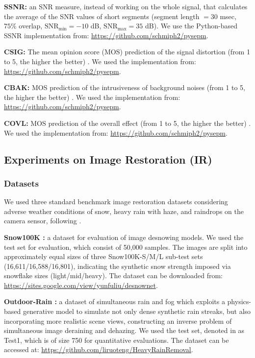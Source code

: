\noindent\textbf{SSNR:} an SNR measure, instead of working on the whole signal, that calculates the average of the SNR values of short segments (segment length $=30$ msec, $75\%$ overlap, $\text{SNR}_{\text{min}}=-10$ dB, $\text{SNR}_{\text{max}}=35$ dB). We use the Python-based SSNR implementation from: \url{https://github.com/schmiph2/pysepm}.

\noindent\textbf{CSIG:} The mean opinion score (MOS) prediction of the signal distortion (from 1 to 5, the higher the better) \citep{hu2007evaluation}. We used the implementation from: \url{https://github.com/schmiph2/pysepm}.

\noindent\textbf{CBAK:} MOS prediction of the intrusiveness of background noises (from 1 to 5, the higher the better) \citep{hu2007evaluation}. We used the implementation from: \url{https://github.com/schmiph2/pysepm}.

\noindent\textbf{COVL:} MOS prediction of the overall effect (from 1 to 5, the higher the better) \citep{hu2007evaluation}. We used the implementation from: \url{https://github.com/schmiph2/pysepm}.


\subsection{Experiments on Image Restoration (IR)}

\subsubsection{Datasets}
We used three standard benchmark image restoration datasets considering adverse weather conditions of snow, heavy rain with haze, and raindrops on the camera sensor, following \citet{ozdenizci2023restoring}. 

\noindent\textbf{Snow100K \citep{liu2018desnownet}:} a dataset for evaluation of image desnowing models. We used the test set for evaluation, which consist of 50,000 samples. The images are split into approximately equal sizes of three Snow100K-S/M/L sub-test sets (16,611/16,588/16,801), indicating the synthetic snow strength imposed via snowflake sizes (light/mid/heavy). The dataset can be downloaded from: \url{https://sites.google.com/view/yunfuliu/desnownet}.

\noindent\textbf{Outdoor-Rain \citep{li2019heavy}:} a dataset of simultaneous rain and
fog which exploits a physics-based generative model to simulate not only dense synthetic rain streaks, but also incorporating more realistic scene views, constructing an inverse
problem of simultaneous image deraining and dehazing. We used the test set, denoted in \citet{li2019heavy} as Test1, which is of size 750 for quantitative evaluations. The dataset can be accessed at: \url{https://github.com/liruoteng/HeavyRainRemoval}.

